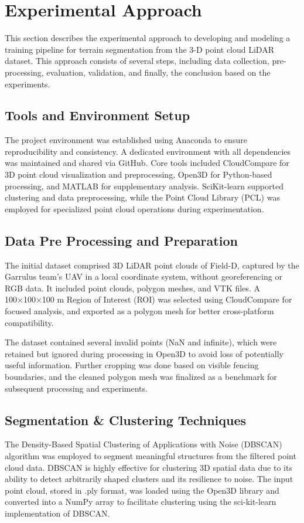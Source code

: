 \documentclass[../report.tex]{subfiles}
\begin{document}
    \section{Experimental Approach}
    This section describes the experimental approach to developing and modeling a training pipeline for terrain segmentation from the 3-D point cloud LiDAR dataset. This approach consists of several steps, including data collection, pre-processing, evaluation, validation, and finally, the conclusion based on the experiments.
    
    \subsection{Tools and Environment Setup}
    The project environment was established using Anaconda to ensure reproducibility and consistency. A dedicated environment with all dependencies was maintained and shared via GitHub. Core tools included CloudCompare for 3D point cloud visualization and preprocessing, Open3D for Python-based processing, and MATLAB for supplementary analysis. SciKit-learn supported clustering and data preprocessing, while the Point Cloud Library (PCL) was employed for specialized point cloud operations during experimentation.

    \subsection{Data Pre Processing and Preparation}
    The initial dataset comprised 3D LiDAR point clouds of Field-D, captured by the Garrulus team’s UAV in a local coordinate system, without georeferencing or RGB data. It included point clouds, polygon meshes, and VTK files. A 100×100×100 m Region of Interest (ROI) was selected using CloudCompare for focused analysis, and exported as a polygon mesh for better cross-platform compatibility.

    The dataset contained several invalid points (NaN and infinite), which were retained but ignored during processing in Open3D to avoid loss of potentially useful information. Further cropping was done based on visible fencing boundaries, and the cleaned polygon mesh was finalized as a benchmark for subsequent processing and experiments.
    
    \subsection{Segmentation & Clustering Techniques}
    The Density-Based Spatial Clustering of Applications with Noise (DBSCAN)\cite{DBSCan_Grammarly} algorithm was employed to segment meaningful structures from the filtered point cloud data. DBSCAN is highly effective for clustering 3D spatial data due to its ability to detect arbitrarily shaped clusters and its resilience to noise. The input point cloud, stored in .ply format, was loaded using the Open3D library and converted into a NumPy array to facilitate clustering using the sci-kit-learn implementation of DBSCAN.
    
\end{document}

